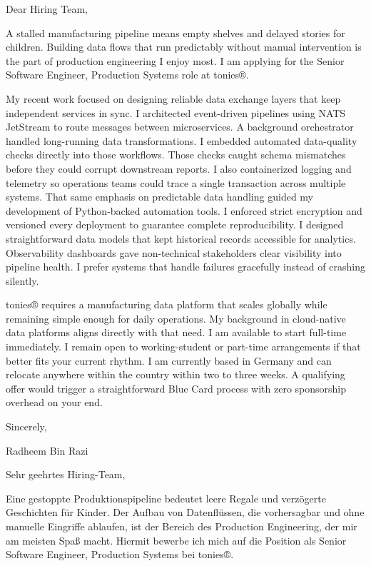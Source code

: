 \documentclass[11pt,a4paper]{coverletter}
\begin{document}

\opening{Dear Hiring Team,}

A stalled manufacturing pipeline means empty shelves and delayed stories for children. Building data flows that run predictably without manual intervention is the part of production engineering I enjoy most. I am applying for the Senior Software Engineer, Production Systems role at tonies®.

My recent work focused on designing reliable data exchange layers that keep independent services in sync. I architected event-driven pipelines using NATS JetStream to route messages between microservices. A background orchestrator handled long-running data transformations. I embedded automated data-quality checks directly into those workflows. Those checks caught schema mismatches before they could corrupt downstream reports. I also containerized logging and telemetry so operations teams could trace a single transaction across multiple systems. That same emphasis on predictable data handling guided my development of Python-backed automation tools. I enforced strict encryption and versioned every deployment to guarantee complete reproducibility. I designed straightforward data models that kept historical records accessible for analytics. Observability dashboards gave non-technical stakeholders clear visibility into pipeline health. I prefer systems that handle failures gracefully instead of crashing silently.

tonies® requires a manufacturing data platform that scales globally while remaining simple enough for daily operations. My background in cloud-native data platforms aligns directly with that need. I am available to start full-time immediately. I remain open to working-student or part-time arrangements if that better fits your current rhythm. I am currently based in Germany and can relocate anywhere within the country within two to three weeks. A qualifying offer would trigger a straightforward Blue Card process with zero sponsorship overhead on your end.

\closing{Sincerely,}{Radheem Bin Razi}

\clearpage
{}


\opening{Sehr geehrtes Hiring-Team,}

Eine gestoppte Produktionspipeline bedeutet leere Regale und verzögerte Geschichten für Kinder. Der Aufbau von Datenflüssen, die vorhersagbar und ohne manuelle Eingriffe ablaufen, ist der Bereich des Production Engineering, der mir am meisten Spaß macht. Hiermit bewerbe ich mich auf die Position als Senior Software Engineer, Production Systems bei tonies®.
\end{document}
